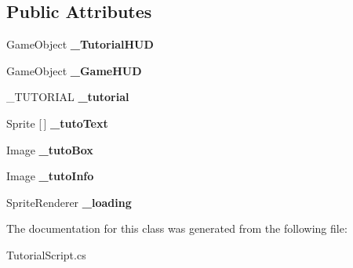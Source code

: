 \subsection*{Public Attributes}
\begin{DoxyCompactItemize}
\item 
\mbox{\label{class_tutorial_script_ab52722849cff3356825d7b90fa65a283}} 
Game\+Object {\bfseries \+\_\+\+Tutorial\+H\+UD}
\item 
\mbox{\label{class_tutorial_script_a376788b5e6e5696201a63d56282018d3}} 
Game\+Object {\bfseries \+\_\+\+Game\+H\+UD}
\item 
\mbox{\label{class_tutorial_script_a22a7be7d7dade111770af91fc14a4fcf}} 
\+\_\+\+T\+U\+T\+O\+R\+I\+AL {\bfseries \+\_\+tutorial}
\item 
\mbox{\label{class_tutorial_script_a9d830927189e92f9be029a5ad164ce67}} 
Sprite \mbox{[}$\,$\mbox{]} {\bfseries \+\_\+tuto\+Text}
\item 
\mbox{\label{class_tutorial_script_a025ae0fa91ceaa15d99bf7130ea423ee}} 
Image {\bfseries \+\_\+tuto\+Box}
\item 
\mbox{\label{class_tutorial_script_af4d0216904eb3e7b6ac825cb93bb7bf3}} 
Image {\bfseries \+\_\+tuto\+Info}
\item 
\mbox{\label{class_tutorial_script_a7e4070a38c83a4c7b6091c06a2a20be8}} 
Sprite\+Renderer {\bfseries \+\_\+loading}
\end{DoxyCompactItemize}


The documentation for this class was generated from the following file\+:\begin{DoxyCompactItemize}
\item 
Tutorial\+Script.\+cs\end{DoxyCompactItemize}
